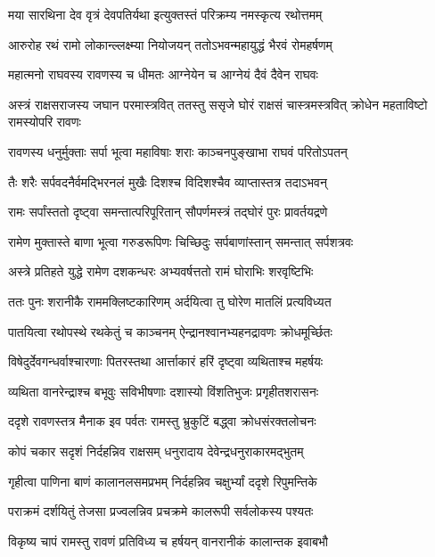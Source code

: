 \twolineshloka
{मया सारथिना देव वृत्रं देवपतिर्यथा}
{इत्युक्तस्तं परिक्रम्य नमस्कृत्य रथोत्तमम्} %

\twolineshloka
{आरुरोह रथं रामो लोकान्ल्लक्ष्म्या नियोजयन्}
{ततोऽभवन्महायुद्धं भैरवं रोमहर्षणम्} %

\twolineshloka
{महात्मनो राघवस्य रावणस्य च धीमतः}
{आग्नेयेन च आग्नेयं दैवं दैवेन राघवः} %

\threelineshloka
{अस्त्रं राक्षसराजस्य जघान परमास्त्रवित्}
{ततस्तु ससृजे घोरं राक्षसं चास्त्रमस्त्रवित्}
{क्रोधेन महताविष्टो रामस्योपरि रावणः} %

\twolineshloka
{रावणस्य धनुर्मुक्ताः सर्पा भूत्वा महाविषाः}
{शराः काञ्चनपुङ्खाभा राघवं परितोऽपतन्} %

\twolineshloka
{तैः शरैः सर्पवदनैर्वमद्भिरनलं मुखैः}
{दिशश्च विदिशश्चैव व्याप्तास्तत्र तदाऽभवन्} %

\twolineshloka
{रामः सर्पांस्ततो दृष्ट्वा समन्तात्परिपूरितान्}
{सौपर्णमस्त्रं तद्घोरं पुरः प्रावर्तयद्रणे} %

\twolineshloka
{रामेण मुक्तास्ते बाणा भूत्वा गरुडरूपिणः}
{चिच्छिदुः सर्पबाणांस्तान् समन्तात् सर्पशत्रवः} %

\twolineshloka
{अस्त्रे प्रतिहते युद्धे रामेण दशकन्धरः}
{अभ्यवर्षत्ततो रामं घोराभिः शरवृष्टिभिः} %

\twolineshloka
{ततः पुनः शरानीकै राममक्लिष्टकारिणम्}
{अर्दयित्वा तु घोरेण मातलिं प्रत्यविध्यत} %

\twolineshloka
{पातयित्वा रथोपस्थे रथकेतुं च काञ्चनम्}
{ऐन्द्रानश्वानभ्यहनद्रावणः क्रोधमूर्च्छितः} %

\twolineshloka
{विषेदुर्देवगन्धर्वाश्चारणाः पितरस्तथा}
{आर्त्ताकारं हरिं दृष्ट्वा व्यथिताश्च महर्षयः} %

\twolineshloka
{व्यथिता वानरेन्द्राश्च बभूवुः सविभीषणाः}
{दशास्यो विंशतिभुजः प्रगृहीतशरासनः} %

\twolineshloka
{ददृशे रावणस्तत्र मैनाक इव पर्वतः}
{रामस्तु भ्रुकुटिं बद्ध्वा क्रोधसंरक्तलोचनः} %

\twolineshloka
{कोपं चकार सदृशं निर्दहन्निव राक्षसम्}
{धनुरादाय देवेन्द्रधनुराकारमद्भुतम्} %

\twolineshloka
{गृहीत्वा पाणिना बाणं कालानलसमप्रभम्}
{निर्दहन्निव चक्षुर्भ्यां ददृशे रिपुमन्तिके} %

\twolineshloka
{पराक्रमं दर्शयितुं तेजसा प्रज्वलन्निव}
{प्रचक्रमे कालरूपी सर्वलोकस्य पश्यतः} %

\twolineshloka
{विकृष्य चापं रामस्तु रावणं प्रतिविध्य च}
{हर्षयन् वानरानीकं कालान्तक इवाबभौ} %

